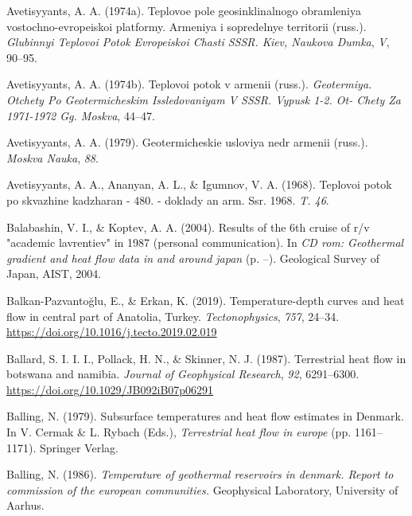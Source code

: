 \documentclass[draft,linenumbers]{agujournal2018}
\begin{document}
\leavevmode{}%
Avetisyyants, A. A. (1974a). Teplovoe pole geosinklinalnogo obramleniya
vostochno-evropeiskoi platformy. Armeniya i sopredelnye territorii
(russ.). \emph{Glubinnyi Teplovoi Potok Evropeiskoi Chasti SSSR. Kiev,
Naukova Dumka}, \emph{V}, 90--95.

\leavevmode{}%
Avetisyyants, A. A. (1974b). Teplovoi potok v armenii (russ.).
\emph{Geotermiya. Otchety Po Geotermicheskim Issledovaniyam V SSSR.
Vypusk 1-2. Ot- Chety Za 1971-1972 Gg. Moskva}, 44--47.

\leavevmode{}%
Avetisyyants, A. A. (1979). Geotermicheskie usloviya nedr armenii
(russ.). \emph{Moskva Nauka}, \emph{88}.

\leavevmode{}%
Avetisyyants, A. A., Ananyan, A. L., \& Igumnov, V. A. (1968). Teplovoi
potok po skvazhine kadzharan - 480. - doklady an arm. Ssr. 1968.
\emph{T. 46}.

\leavevmode{}%
Balabashin, V. I., \& Koptev, A. A. (2004). Results of the 6th cruise of
r/v "academic lavrentiev" in 1987 (personal communication). In \emph{CD
rom: Geothermal gradient and heat flow data in and around japan} (p.
--). Geological Survey of Japan, AIST, 2004.

\leavevmode{}%
Balkan-Pazvantoğlu, E., \& Erkan, K. (2019). Temperature-depth curves
and heat flow in central part of {Anatolia}, {Turkey}.
\emph{Tectonophysics}, \emph{757}, 24--34.
\url{https://doi.org/10.1016/j.tecto.2019.02.019}

\leavevmode{}%
Ballard, S. I. I. I., Pollack, H. N., \& Skinner, N. J. (1987).
Terrestrial heat flow in botswana and namibia. \emph{Journal of
Geophysical Research}, \emph{92}, 6291--6300.
\url{https://doi.org/10.1029/JB092iB07p06291}

\leavevmode{}%
Balling, N. (1979). Subsurface temperatures and heat flow estimates in
{Denmark}. In V. Cermak \& L. Rybach (Eds.), \emph{Terrestrial heat flow
in europe} (pp. 1161--1171). Springer Verlag.

\leavevmode{}%
Balling, N. (1986). \emph{Temperature of geothermal reservoirs in
denmark. Report to commission of the european communities.} Geophysical
Laboratory, University of Aarhus.
\end{document}
